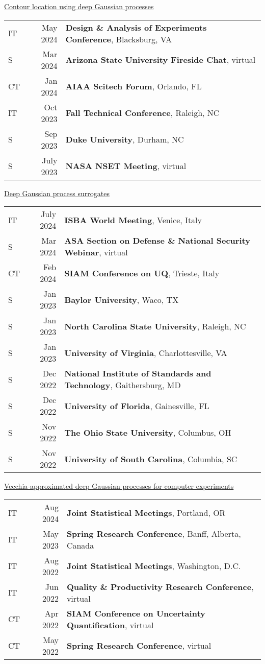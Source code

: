 \documentclass[margin,line,11pt]{res}
\begin{document}
\begin{resume}
\underline{Contour location using deep Gaussian processes}\\
\begin{tabular}{lrl}
IT\quad\quad & May 2024 & {\bf Design \& Analysis of Experiments Conference}, Blacksburg, VA \\
S\quad\quad & Mar 2024 & {\bf Arizona State University Fireside Chat}, virtual \\
CT\quad\quad & Jan 2024 & {\bf AIAA Scitech Forum}, Orlando, FL \\
IT\quad\quad & Oct 2023 & {\bf Fall Technical Conference}, Raleigh, NC \\
S\quad\quad & Sep 2023 & {\bf Duke University}, Durham, NC \\ 
S\quad\quad & July 2023 & {\bf NASA NSET Meeting}, virtual \\
\end{tabular}

\underline{Deep Gaussian process surrogates}\\
\begin{tabular}{lrl}
IT\quad\quad & July 2024 & {\bf ISBA World Meeting}, Venice, Italy \\
S\quad\quad & Mar 2024 & {\bf ASA Section on Defense \& National Security Webinar}, virtual \\
CT\quad\quad & Feb 2024 & {\bf SIAM Conference on UQ}, Trieste, Italy \\
S\quad\quad & Jan 2023 & {\bf Baylor University}, Waco, TX \\
S\quad\quad & Jan 2023 & {\bf North Carolina State University}, Raleigh, NC \\
S\quad\quad & Jan 2023 & {\bf University of Virginia}, Charlottesville, VA \\
S\quad\quad & Dec 2022 & {\bf National Institute of Standards and Technology}, Gaithersburg, MD \\
S\quad\quad & Dec 2022 & {\bf University of Florida}, Gainesville, FL \\
S\quad\quad & Nov 2022 & {\bf The Ohio State University}, Columbus, OH \\
S\quad\quad & Nov 2022 & {\bf University of South Carolina}, Columbia, SC \\
\end{tabular}

\underline{Vecchia-approximated deep Gaussian processes for computer experiments}\\
\begin{tabular}{lrl}
IT & Aug 2024 & {\bf Joint Statistical Meetings}, Portland, OR \\
IT & May 2023 & {\bf Spring Research Conference}, Banff, Alberta, Canada \\
IT & Aug 2022 & {\bf Joint Statistical Meetings}, Washington, D.C. \\
IT & Jun 2022 & {\bf Quality \& Productivity Research Conference}, virtual \\
CT & Apr 2022 & {\bf SIAM Conference on Uncertainty Quantification}, virtual \\
CT & May 2022 & {\bf Spring Research Conference}, virtual \\
\end{tabular}


\end{resume}
\end{document}

